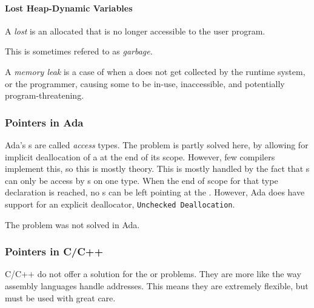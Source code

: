 \paragraph{Lost Heap-Dynamic Variables}\label{par:Pointer-Lost_Heap_Dynamic}
\begin{definition}\label{def:Lost_Heap_Dynamic_Variable}
  A \emph{lost } is an allocated  that is no longer accessible to the user program.

  This is sometimes refered to as \emph{garbage}.
\end{definition}

\begin{definition}\label{def:Memory_Leak}
  A \emph{memory leak} is a case of when a  does not get collected by the runtime system, or the programmer, causing some  to be in-use, inaccessible, and potentially program-threatening.
\end{definition}

\subsubsection{Pointers in Ada}\label{subsubsec:Pointer-Ada}
Ada's s are called \emph{access} types.
The  problem is partly solved here, by allowing for implicit deallocation of a  at the end of its  scope.
However, few compilers implement this, so this is mostly theory.
This is mostly handled by the fact that s can only be access by s on one type.
When the end of scope for that type declaration is reached, no s can be left pointing at the .
However, Ada does have support for an explicit deallocator, \texttt{Unchecked \textunderscore{} Deallocation}.

The  problem was not solved in Ada.

\subsubsection{Pointers in C/C++}\label{subsubsec:Pointer-C_C++}
C/C++ do not offer a solution for the  or  problems.
They are more like the way assembly languages handle addresses.
This means they are extremely flexible, but must be used with great care.


